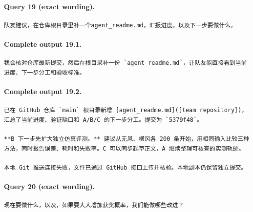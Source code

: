 \documentclass[UTF8,10pt]{ctexart}
\begin{document}
\paragraph{Query 19 (exact wording).}
\begin{Verbatim}[breaklines=true,breakanywhere=true,fontsize=\scriptsize,frame=single,framesep=2pt]
队友建议，在仓库根目录里补一个agent_readme.md，汇报进度。以及下一步要做什么。
\end{Verbatim}

\paragraph{Complete output 19.1.}
\begin{Verbatim}[breaklines=true,breakanywhere=true,fontsize=\scriptsize,frame=single,framesep=2pt]
我会核对仓库最新提交，然后在根目录补一份 `agent_readme.md`，让队友能直接看到当前进度、下一步分工和验收标准。
\end{Verbatim}

\paragraph{Complete output 19.2.}
\begin{Verbatim}[breaklines=true,breakanywhere=true,fontsize=\scriptsize,frame=single,framesep=2pt]
已在 GitHub 仓库 `main` 根目录新增 [agent_readme.md]([team repository])，汇总了当前进度、验证缺口和 A/B/C 的下一步分工。提交为 `5379f48`。

**B 下一步先扩大独立仿真评测。** 建议从无风、横风各 200 条开始，用相同输入比较三种方法，同时报告误差、耗时和失败率。C 可以同步起草正文，A 继续整理可核查的实测轨迹。

本地 Git 推送连接失败，文件已通过 GitHub 接口上传并核验。本地副本仍保留独立提交。
\end{Verbatim}

\paragraph{Query 20 (exact wording).}
\begin{Verbatim}[breaklines=true,breakanywhere=true,fontsize=\scriptsize,frame=single,framesep=2pt]
现在要做什么，以及，如果要大大增加获奖概率，我们能做哪些改进？
\end{Verbatim}
\end{document}
